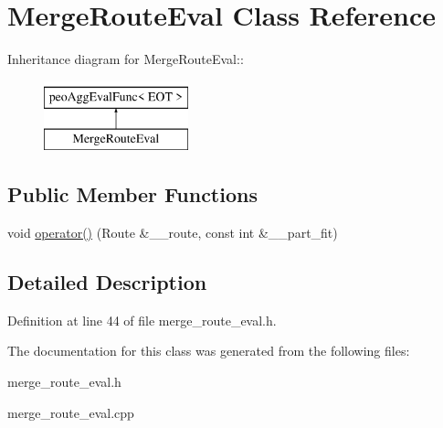 \hypertarget{classMergeRouteEval}{
\section{Merge\-Route\-Eval Class Reference}
\label{classMergeRouteEval}
}
Inheritance diagram for Merge\-Route\-Eval::\begin{figure}[H]
\begin{center}
\leavevmode
\includegraphics[height=2cm]{classMergeRouteEval}
\end{center}
\end{figure}
\subsection*{Public Member Functions}
\begin{CompactItemize}
\item 
\hypertarget{classMergeRouteEval_29cb0028ac0df4b2cee3a809c8f35dea}{
void \hyperlink{classMergeRouteEval_29cb0028ac0df4b2cee3a809c8f35dea}{operator()} (Route \&\_\-\_\-route, const int \&\_\-\_\-part\_\-fit)}
\label{classMergeRouteEval_29cb0028ac0df4b2cee3a809c8f35dea}

\end{CompactItemize}


\subsection{Detailed Description}




Definition at line 44 of file merge\_\-route\_\-eval.h.

The documentation for this class was generated from the following files:\begin{CompactItemize}
\item 
merge\_\-route\_\-eval.h\item 
merge\_\-route\_\-eval.cpp\end{CompactItemize}
